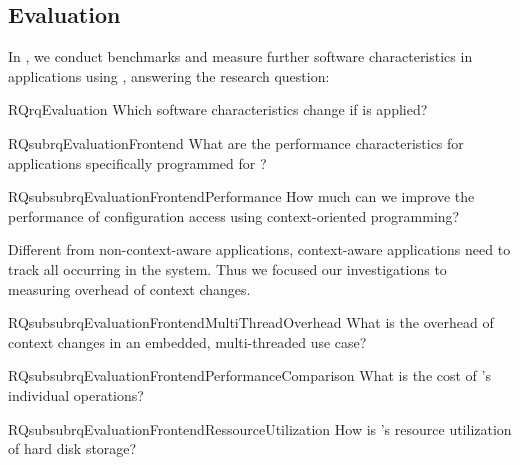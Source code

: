 \subsection{Evaluation}

In , we conduct benchmarks and measure further software characteristics in applications using \elektra{}, answering the research question:

\begin{restatable}{RQ}{rqEvaluation}
Which software characteristics change if \elektra{} is applied?%
\label{rq:evaluation}
\end{restatable}

\begin{restatable}{RQsub}{rqEvaluationFrontend}
\label{rq:evaluation-frontend}
What are the performance characteristics for applications specifically programmed for \elektra{}?
\end{restatable}

\begin{restatable}{RQsubsub}{rqEvaluationFrontendPerformance}
\label{rq:evaluation-frontend-performance}
How much can we improve the performance of configuration access using context-oriented programming?
\end{restatable}

Different from non-context-aware applications, context-aware applications need to track all  occurring in the system.
Thus we focused our investigations to measuring overhead of context changes.

\begin{restatable}{RQsubsub}{rqEvaluationFrontendMultiThreadOverhead}
\label{rq:evaluation-frontend-multi-thread-overhead}
What is the overhead of context changes in an embedded, multi-threaded use case?
\end{restatable}

\begin{restatable}{RQsubsub}{rqEvaluationFrontendPerformanceComparison}
\label{rq:evaluation-frontend-performance-comparison}
What is the cost of \elektra{}'s individual operations?
\end{restatable}

\begin{restatable}{RQsubsub}{rqEvaluationFrontendRessourceUtilization}
\label{rq:evaluation-frontend-resource-utilization}
How is \elektra{}'s resource utilization of hard disk storage?
\end{restatable}

